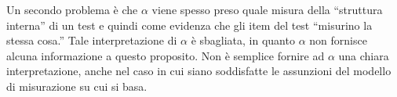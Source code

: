 Un secondo problema è che $\alpha$ viene spesso preso quale
  misura della ``struttura interna'' di un test e quindi come evidenza
  che gli item del test ``misurino la stessa cosa.'' 
 Tale interpretazione di $\alpha$  è sbagliata, in quanto 
$\alpha$  non fornisce alcuna informazione a questo proposito.  
%
Non è  semplice fornire ad  $\alpha$ una chiara interpretazione, anche nel caso in cui siano soddisfatte le assunzioni del modello di misurazione su cui si basa. 
   
